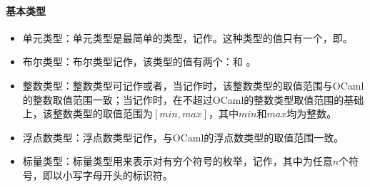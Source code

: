 \paragraph{基本类型}
\begin{itemize}
	\item 单元类型：单元类型是最简单的类型，记作。这种类型的值只有一个，即\code{()}。
	\item 布尔类型：布尔类型记作，该类型的值有两个：和 。
	\item 整数类型：整数类型可记作或者，当记作时，该整数类型的取值范围与OCaml的整数取值范围一致；当记作时，在不超过OCaml的整数类型取值范围的基础上，该整数类型的取值范围为$[min,max]$，其中$min$和$max$均为整数。
	\item 浮点数类型：浮点数类型记作，与OCaml的浮点数类型的取值范围一致。
	\item 标量类型：标量类型用来表示对有穷个符号的枚举，记作，其中为任意$n$个符号，即以小写字母开头的标识符。
\end{itemize}
